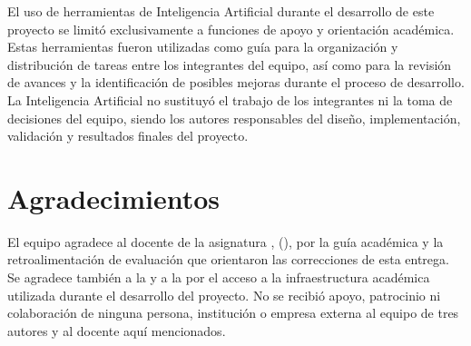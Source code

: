 El uso de herramientas de Inteligencia Artificial durante el desarrollo de
este proyecto se limitó exclusivamente a funciones de apoyo y orientaci\'on acad\'emica.
Estas herramientas fueron utilizadas como gu\'ia para la organizaci\'on y
distribuci\'on de tareas entre los integrantes del equipo, as\'i como para la
revisi\'on de avances y la identificaci\'on de posibles mejoras durante el proceso
 de desarrollo. La Inteligencia Artificial no sustituy\'o el trabajo de los
 integrantes ni la toma de decisiones del equipo, siendo los autores responsables
 del dise\~no, implementaci\'on, validaci\'on y resultados finales del proyecto.


\section{Agradecimientos}

El equipo agradece al docente de la asignatura \asignatura{},
\docente{} (\correodocente{}), por la gu\'ia acad\'emica y la
retroalimentaci\'on de evaluaci\'on que orientaron las correcciones de
esta entrega. Se agradece tambi\'en a la \universidad{} y a la
\facultad{} por el acceso a la infraestructura acad\'emica utilizada
durante el desarrollo del proyecto. No se recibi\'o apoyo, patrocinio ni
colaboraci\'on de ninguna persona, instituci\'on o empresa externa al
equipo de tres autores y al docente aqu\'i mencionados.
